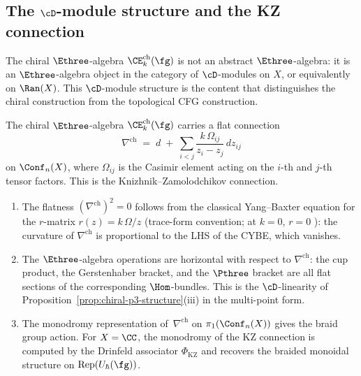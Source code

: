 \subsection{The $\cD$-module structure and the KZ connection}
\label{subsec:chiral-e3-dmod}

The chiral $\Ethree$-algebra
$\CE^{\mathrm{ch}}_k(\fg)$ is not an abstract
$\Ethree$-algebra: it is an $\Ethree$-algebra object
in the category of $\cD$-modules on $X$, or equivalently
on $\Ran(X)$. This $\cD$-module structure is the content
that distinguishes the chiral construction from the
topological CFG construction.

\begin{proposition}
\label{prop:chiral-e3-dmod}
The chiral $\Ethree$-algebra
$\CE^{\mathrm{ch}}_k(\fg)$ carries a flat connection
\begin{equation}\label{eq:chiral-e3-connection}
  \nabla^{\mathrm{ch}}
  \;=\;
  d \;+\; \sum_{i < j}
  \frac{k\,\Omega_{ij}}{z_i - z_j}\,dz_{ij}
\end{equation}
on $\Conf_n(X)$, where $\Omega_{ij}$ is the Casimir element
acting on the $i$-th and $j$-th tensor factors. This is the
Knizhnik--Zamolodchikov connection.
\begin{enumerate}[label=\textup{(\roman*)}]
\item The flatness
  $(\nabla^{\mathrm{ch}})^2 = 0$ follows from the
  classical Yang--Baxter equation for the $r$-matrix
  $r(z) = k\,\Omega/z$
  \textup{(}trace-form convention; at $k = 0$, $r = 0$%
  \textup{)}: the curvature of $\nabla^{\mathrm{ch}}$
  is proportional to the LHS of the CYBE, which vanishes.
\item The $\Ethree$-algebra operations are horizontal
  with respect to $\nabla^{\mathrm{ch}}$: the cup product,
  the Gerstenhaber bracket, and the $\Pthree$ bracket are
  all flat sections of the corresponding $\Hom$-bundles.
  This is the $\cD$-linearity of
  Proposition~\textup{\ref{prop:chiral-p3-structure}(iii)}
  in the multi-point form.
\item The monodromy representation of~$\nabla^{\mathrm{ch}}$
  on $\pi_1(\Conf_n(X))$ gives the braid group action.
  For $X = \CC$, the monodromy of the KZ connection
  is computed by the Drinfeld associator
  $\Phi_{\mathrm{KZ}}$
  and recovers the braided monoidal structure on
  $\mathrm{Rep}(U_\hbar(\fg))$.
\end{enumerate}
\end{proposition}

